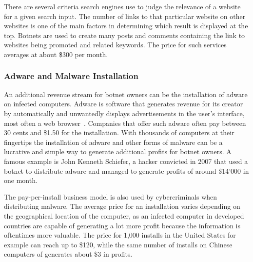 There are several criteria search engines use to judge the relevance of a website for a given search input.
The number of links to that particular website on other websites is one of the main factors in determining which result is displayed at the top.
Botnets are used to create many posts and comments containing the link to websites being promoted and related keywords.
The price for such services averages at about \$300 per month.\cite{Namestnikov09}

\subsubsection{Adware and Malware Installation}
An additional revenue stream for botnet owners can be the installation of adware on infected computers.
Adware is software that generates revenue for its creator by automatically and unwantedly displays advertisements in the user's interface, most often a web browser~\cite{Malwarebytes19}.
Companies that offer such adware often pay between 30 cents and \$1.50 for the installation.
With thousands of computers at their fingertips the installation of adware and other forms of malware can be a lucrative and simple way to generate additional profits for botnet owners.
A famous example is John Kenneth Schiefer, a hacker convicted in 2007 that used a botnet to distribute adware and managed to generate profits of around \$14'000 in one month.\cite{Namestnikov09}

The pay-per-install business model is also used by cybercriminals when distributing malware.
The average price for an installation varies depending on the geographical location of the computer, as an infected computer in developed countries are capable of generating a lot more profit because the information is oftentimes more valuable.
The price for 1,000 installs in the United States for example can reach up to \$120, while the same number of installs on Chinese computers of generates about \$3 in profits.\cite{Namestnikov09}

